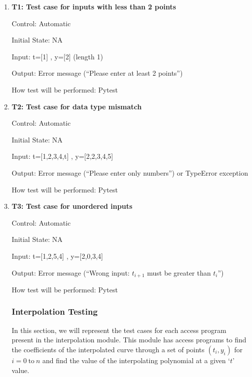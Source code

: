 \documentclass[12pt, titlepage]{article}
\begin{document}
\begin{enumerate}

\item{\textbf{T1: Test case for inputs with less than 2 points}\\}\label{{T1}}

Control: Automatic

Initial State: NA

Input: t=[1] , y=[2] (length 1)

Output: Error message (``Please enter at least  2 
points'')

How test will be performed: Pytest

\item{\textbf{T2: Test case for data type mismatch}\\}

Control: Automatic

Initial State: NA

Input: t=[1,2,3,4,t] , y=[2,2,3,4,5] 

Output: Error message (``Please enter only numbers'') or TypeError exception

How test will be performed: Pytest

\item{\textbf{T3: Test case for unordered inputs}\\}

Control: Automatic

Initial State: NA

Input: t=[1,2,5,4] , y=[2,0,3,4] 

Output: Error message (``Wrong input: $t_{i+1}$ must be greater than $t_i$'')

How test will be performed: Pytest



\subsubsection{Interpolation Testing}\label{InterpolationTesting}

In this section, we will represent the test cases for each access program 
present in the interpolation module. This module has access programs to find 
the coefficients of the interpolated curve through a set of points $(t_i,y_i)$ 
for $i = 0\ \text{to}\ n$ and find the value of the interpolating polynomial at 
a given `$t$' value.




\end{enumerate}
\end{document}
